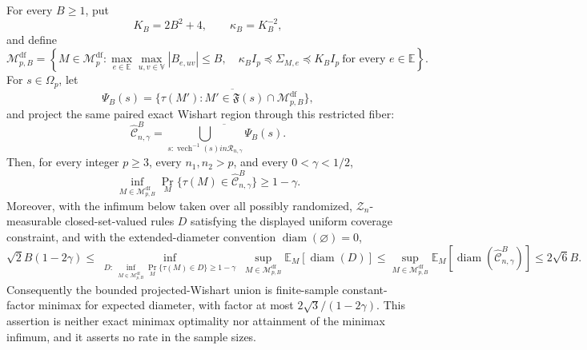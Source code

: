 For every \(B\ge1\), put
\[
K_B=2B^2+4,
\qquad
\kappa_B=K_B^{-2},
\]
and define
\[
\mathcal M_{p,B}^{\mathrm{df}}
=\left\{M\in\mathcal M_p^{\mathrm{df}}:
\max_{e\in\mathbb E}\max_{u,v\in\mathbb V}|B_{e,uv}|\le B,
\quad
\kappa_B I_p\preceq\Sigma_{M,e}\preceq K_BI_p
\ \text{for every }e\in\mathbb E\right\}.
\]
For \(s\in\Omega_p\), let
\[
\Psi_B(s)
=\overline{\{\tau(M'):M'\in\mathfrak F(s)\cap
\mathcal M_{p,B}^{\mathrm{df}}\}},
\]
and project the same paired exact Wishart region through this restricted fiber:
\[
\widehat{\mathcal C}^{B}_{n,\gamma}
=\overline{\bigcup_{s:\operatorname{vech}^{-1}(s)in
\mathcal R_{n,\gamma}}\Psi_B(s)}.
\]
Then, for every integer \(p\ge3\), every \(n_1,n_2>p\), and every \(0<\gamma<1/2\),
\[
\inf_{M\in\mathcal M_{p,B}^{\mathrm{df}}}
\Pr_M\{\tau(M)\in\widehat{\mathcal C}^{B}_{n,\gamma}\}
\ge1-\gamma.
\]
Moreover, with the infimum below taken over all possibly randomized, \(\mathcal Z_n\)-measurable closed-set-valued rules \(D\) satisfying the displayed uniform coverage constraint, and with the extended-diameter convention \(\operatorname{diam}(\varnothing)=0\),
\[
\sqrt2 B(1-2\gamma)
\le
\inf_{\substack{D:\ 
 \inf_{M\in\mathcal M_{p,B}^{\mathrm{df}}}
 \Pr_M\{\tau(M)\in D\}\ge1-\gamma}}
\sup_{M\in\mathcal M_{p,B}^{\mathrm{df}}}
\mathbb E_M[\operatorname{diam}(D)]
\le
\sup_{M\in\mathcal M_{p,B}^{\mathrm{df}}}
\mathbb E_M[\operatorname{diam}(\widehat{\mathcal C}^{B}_{n,\gamma})]
\le2\sqrt6 B.
\]
Consequently the bounded projected-Wishart union is finite-sample constant-factor minimax for expected diameter, with factor at most \(2\sqrt3/(1-2\gamma)\).  This assertion is neither exact minimax optimality nor attainment of the minimax infimum, and it asserts no rate in the sample sizes.